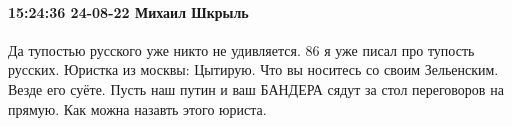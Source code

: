  
 
 
 
 

\paragraph{15:24:36 24-08-22 Михаил Шкрыль}

Да тупостью русского уже никто не удивляется. 86%
я уже писал про тупость русских. Юристка из москвы: Цытирую. Что вы носитесь со
своим Зельенским. Везде его суёте. Пусть наш путин и ваш БАНДЕРА сядут за стол
переговоров на прямую. Как можна назавть этого юриста.
